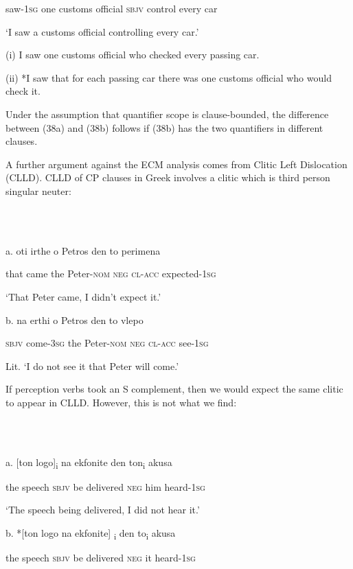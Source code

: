 \documentclass[output=paper]{langsci/langscibook}
\begin{document}
    saw{}-\textsc{1sg}   one   customs official  \textsc{sbjv} control  every  car

    ‘I saw a customs official controlling every car.’

    (i)  I saw one customs official who checked every passing car.

    (ii)  *I saw that for each passing car there was one customs official who         would check it.

Under the assumption that quantifier scope is clause-bounded, the difference between (38a) and (38b) follows if (38b) has the two quantifiers in different clauses. 

  A further argument against the ECM analysis comes from Clitic Left Dislocation (CLLD). CLLD of CP clauses in Greek involves a clitic which is third person singular neuter:

\ea%
    \label{ex:key:39}
    \gll\\
        \\
    \glt
    \z

          a.  oti   irthe   o     Petros      den  to       perimena

    that  came the  Peter-\textsc{nom  neg}  \textsc{cl-acc} expected{}-\textsc{1sg}

    ‘That Peter came, I didn't expect it.’

  b.  na    erthi         o   Petros       den   to      vlepo

    \textsc{sbjv} come{}-\textsc{3sg} the Peter-\textsc{nom  neg}  \textsc{cl-acc} see{}-\textsc{1sg}

    Lit. ‘I do not see it that Peter will come.’

If perception verbs took an S complement, then we would expect the same clitic to appear in CLLD. However, this is not what we find:

\ea%
    \label{ex:key:40}
    \gll\\
        \\
    \glt
    \z

          a.  [ton logo]\textsubscript{i}     na       ekfonite        den  ton\textsubscript{i} akusa

    the  speech    \textsc{sbjv} be delivered  \textsc{neg}  him heard{}-\textsc{1sg}

    ‘The speech being delivered, I did not hear it.’

  b.  *[ton logo    na     ekfonite]\textsubscript{ i}     den  to\textsubscript{i}  akusa

      the speech  \textsc{sbjv} be delivered   \textsc{neg}  it   heard{}-\textsc{1sg}
\end{document}
